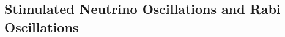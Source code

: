 \documentclass[9pt]{beamer}
\begin{document}
\begin{darkframes}
%
%
%
%
%
%
%
%
%
%
%
%
%
%
%
%
%
%
%
%


\subsection{Stimulated Neutrino Oscillations and Rabi Oscillations}


\end{darkframes}
\end{document}
